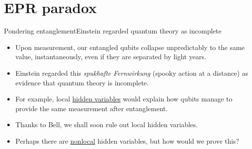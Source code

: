 \section{EPR paradox}

\begin{frame}{Pondering entanglement}{Einstein regarded quantum theory as incomplete}

\begin{itemize}
    \item<1-> Upon measurement, our entangled qubits collapse unpredictably to the same value, instantaneously, even if they are separated by light years.
    \item<2-> Einstein regarded this \textit{spukhafte Fernwirkung} (spooky action at a distance) as evidence that quantum theory is incomplete.
    \item<3-> For example, local \href{https://en.wikipedia.org/wiki/Hidden-variable_theory}{hidden variables} would explain how qubits manage to provide the same measurement after entanglement.
    \item<6-> Thanks to Bell, we shall soon rule out local hidden variables.
    \item<7-> Perhaps there are \href{https://en.wikipedia.org/wiki/Principle_of_locality}{nonlocal} hidden variables, but how would we prove this?
\end{itemize}
    
\end{frame}

